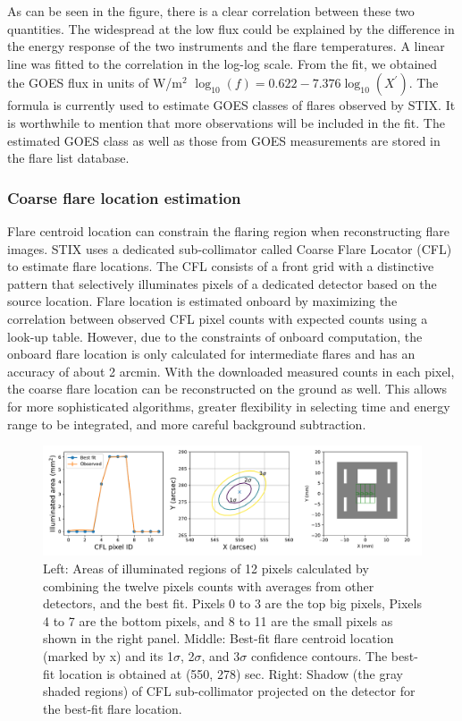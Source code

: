\documentclass[referee]{aa} %
\begin{document}
As can be seen in the figure, there is a clear correlation between
these two quantities.  The widespread at the low flux could be explained by the difference in 
the energy response of the two instruments and the flare temperatures. 
A linear line was fitted to the correlation in the log-log scale. 
From the fit, we obtained 
the GOES flux in units of W/m$^2$ $\log_{10}(f) = 0.622 -7.376 \log_{10} (X^{'})$.
The formula is currently used to estimate GOES classes of flares observed by STIX. 
It is worthwhile to mention that more observations will be included in the fit.
The estimated GOES class as well as those from GOES measurements 
are stored in the flare list database. 

\subsubsection{Coarse flare location estimation}
Flare centroid location can constrain the flaring region when reconstructing flare images.
STIX uses a dedicated sub-collimator called Coarse Flare Locator (CFL) to estimate flare locations.
The CFL consists of a front grid with
a distinctive pattern that selectively illuminates pixels of a 
dedicated detector based on the source location.
Flare location is estimated onboard by maximizing the correlation between observed CFL pixel counts 
with expected counts using a look-up table. 
However, due to the constraints of onboard computation, the onboard flare location is  only calculated for intermediate flares 
and has an accuracy of about 2 arcmin. 
With the downloaded measured counts in each pixel,
the coarse flare location can be reconstructed on the ground as well. 
This allows for more sophisticated algorithms, greater flexibility in selecting time and energy 
range to be integrated, and more careful background subtraction.

\begin{figure}
  \centering
  \includegraphics[width=0.95\linewidth]{figures/cflMay07.pdf}
  \caption{
   Left: Areas of illuminated regions of 12 pixels calculated by combining
  the twelve pixels counts with averages from other detectors, and the best fit. 
  Pixels 0 to 3 are the top big pixels, Pixels 4 to 7 are the bottom pixels, and 8 to 11 are the small pixels as shown in the right panel.
   Middle: Best-fit flare centroid location (marked by x) and its 1$\sigma$, 2$\sigma$, and 3$\sigma$ confidence contours.
   The best-fit location is obtained at (550, 278) sec. 
    Right:  Shadow (the gray shaded regions) of CFL sub-collimator projected on the detector 
  for the best-fit flare location. }
  \label{fig:cfl}
\end{figure}
\end{document}
